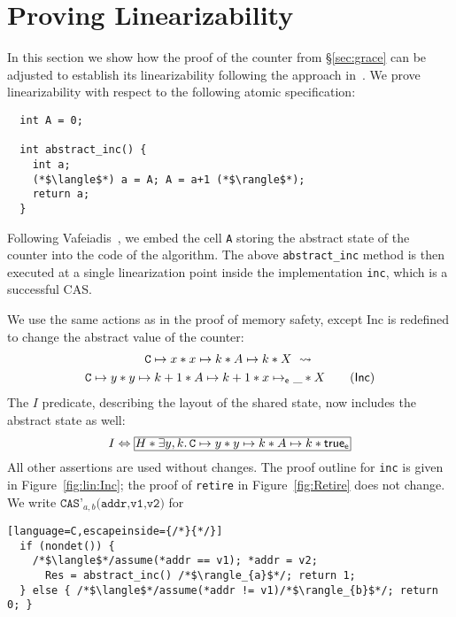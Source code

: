 \section{Proving Linearizability\label{app:lin}}

In this section we show how the proof of the counter from \S\ref{sec:grace} can
be adjusted to establish its linearizability following the approach
in~\cite{rgsep}. We prove linearizability with respect to the following atomic
specification:
\begin{flushleft}
\begin{lstlisting}
  int A = 0;

  int abstract_inc() {
    int a;
    (*$\langle$*) a = A; A = a+1 (*$\rangle$*);
    return a;
  }
\end{lstlisting}
\end{flushleft}
Following Vafeiadis~\cite{rgsep}, we embed the cell {\tt A} storing the abstract
state of the counter into the code of the algorithm. The above
\verb|abstract_inc| method is then executed at a single linearization point
inside the implementation {\tt inc}, which is a successful CAS.

We use the same actions as in the proof of memory safety, except {\sf Inc} is
redefined to change the abstract value of the counter:
\begin{multline*}
\cc \mapsto x * x \mapsto k * A \mapsto k * X
\ \leadsto {}\\
\cc \mapsto y * y \mapsto k+1 *A \mapsto k+1 *  x \mapsto_\se \_ * X
\tag{$\textsf{Inc}$}
\end{multline*}
The $I$ predicate, describing the layout of the shared state, now includes the
abstract state as well:
$$
I \Leftrightarrow \shareds{H * \exists y, k.\, \cc \mapsto y * y \mapsto k 
* A \mapsto k *  \true_\se}
$$
All other assertions are used without changes.  The proof outline for {\tt inc}
is given in Figure~\ref{fig:lin:Inc}; the proof of {\tt retire} in
Figure~\ref{fig:Retire} does not change. We write $\texttt{CAS'}_{a,
  b}\texttt{(addr,v1,v2)}$ for
\begin{flushleft}
\begin{lstlisting}[language=C,escapeinside={/*}{*/}]
  if (nondet()) {
    /*$\langle$*/assume(*addr == v1); *addr = v2; 
      Res = abstract_inc() /*$\rangle_{a}$*/; return 1;
  } else { /*$\langle$*/assume(*addr != v1)/*$\rangle_{b}$*/; return 0; }
\end{lstlisting}
\end{flushleft}


